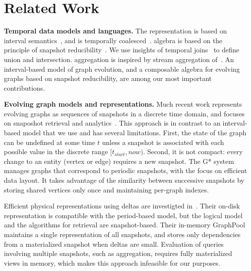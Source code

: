 \section{Related Work}
\label{sec:related}

{\bf Temporal data models and languages.} 
The \tg representation is based on
interval semantics~\cite{DBLP:reference/db/JensenS09k}, and is
temporally coalesced~\cite{DBLP:conf/vldb/BohlenSS96}.  \tg algebra is
based on the principle of snapshot
reducibility~\cite{DBLP:reference/db/Bohlen092}.  We use insights of
temporal joins~\cite{Gao2005} to define \tg union and intersection.
aggregation is inspired by stream aggregation of~\cite{Li2005}.  An
interval-based model of graph evolution, and a composable algebra for
evolving graphs based on snapshot reducibility, are among our most
important contributions.

{\bf Evolving graph models and representations.} Much recent work represents evolving graphs as sequences
of snapshots in a discrete time domain, and focuses on snaposhot
retrieval and
analytics~\cite{Khurana2013,DBLP:journals/tos/MiaoHLWYZPCC15,Ren2011}.
This approach is in contrast to an interval-based model that we use and has
several limitations.  First, the state of the graph can be undefined
at some time $t$ unless a snapshot is associated with each possible
value in the discrete range $[t_{start}, now)$.  Second, it is not
  compact: every change to an entity (vertex or edge) requires a new
  snapshot.
%
The G* system~\cite{Labouseur2015} manages graphs that correspond to
periodic snapshots, with the focus on efficient data layout.  It takes
advantage of the similarity between successive snapshots by storing
shared vertices only once and maintaining per-graph indexes. 

Efficient physical representations using deltas are investigted
in~\cite{Khurana2013}.  Their on-disk representation is compatible
with the period-based model, but the logical model and the algorithms
for retrieval are snapshot-based.  Their in-memory GraphPool maintains
a single representation of all snapshots, and stores only dependencies
from a materialized snapshot when deltas are small.  Evaluation of
queries involving multiple snapshots, such as aggregation, requires
fully materialized views in memory, which makes this approach
infeasible for our purposes.  


